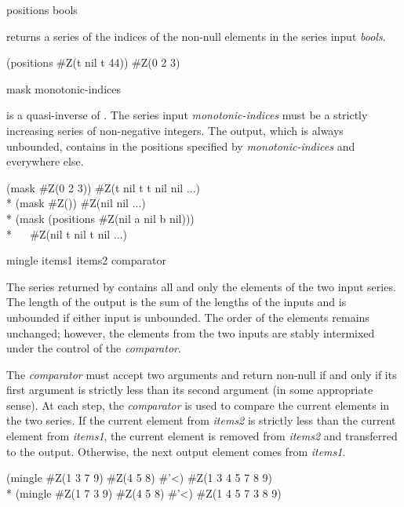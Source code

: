 \begin{defun}[Function]
positions bools

 returns a series of the indices of the non-null elements in
the series input \emph{bools}.
\begin{lisp}
(positions \#Z(t nil t 44)) {\EV} \#Z(0 2 3)
\end{lisp}
\end{defun}

\begin{defun}[Function]
mask monotonic-indices

 is a quasi-inverse of .  The series input {\it
monotonic-indices} must be a strictly increasing series of non-negative
integers.  The output, which is always unbounded, contains  in the
positions specified by \emph{monotonic-indices} and  everywhere else.
\begin{lisp}
(mask \#Z(0 2 3)) {\EV} \#Z(t nil t t nil nil ...) \\*
(mask \#Z()) {\EV} \#Z(nil nil ...) \\*
(mask (positions \#Z(nil a nil b nil))) \\*
~~{\EV} \#Z(nil t nil t nil ...)
\end{lisp}
\end{defun}


\begin{defun}[Function]
mingle items1 items2 comparator

The series returned by  contains all and only the elements of
the two input series.  The length of the output is the sum of the lengths
of the inputs and is unbounded if either input is unbounded.  The order of
the elements remains unchanged; however, the elements from the two inputs
are stably intermixed under the control of the \emph{comparator}.

The \emph{comparator} must accept two arguments and return non-null if and only
if its first argument is strictly less than its second argument (in some
appropriate sense).  At each step, the \emph{comparator} is used to compare
the current elements in the two series.  If the current element from {\it
items2} is strictly less than the current element from \emph{items1}, the
current element is removed from \emph{items2} and transferred to the output.
Otherwise, the next output element comes from \emph{items1}.
\begin{lisp}
(mingle \#Z(1 3 7 9) \#Z(4 5 8) \#'<) {\EV} \#Z(1 3 4 5 7 8 9) \\*
(mingle \#Z(1 7 3 9) \#Z(4 5 8) \#'<) {\EV} \#Z(1 4 5 7 3 8 9)
\end{lisp}
\end{defun}

